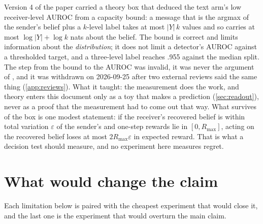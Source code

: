 \documentclass[11pt,a4paper]{report}
\begin{document}
Version 4 of the paper carried a theory box that deduced the text arm's low receiver-level AUROC from a capacity bound: a message that is the argmax of the sender's belief plus a $k$-level label takes at most $|Y|\,k$ values and so carries at most $\log |Y| + \log k$ nats about the belief. The bound is correct and limits information about the \emph{distribution}; it does not limit a detector's AUROC against a thresholded target, and a three-level label reaches .955 against the median split. The step from the bound to the AUROC was invalid, it was never the argument of \citet{2606.20662}, and it was withdrawn on 2026-09-25 after two external reviews said the same thing (\cref{app:reviews}). What it taught: the measurement does the work, and theory enters this document only as a toy that makes a prediction (\cref{sec:readout}), never as a proof that the measurement had to come out that way. What survives of the box is one modest statement: if the receiver's recovered belief is within total variation $\varepsilon$ of the sender's and one-step rewards lie in $[0, R_{\max}]$, acting on the recovered belief loses at most $2 R_{\max} \varepsilon$ in expected reward. That is what a decision test should measure, and no experiment here measures regret.

\section{What would change the claim}
\label{sec:change}

Each limitation below is paired with the cheapest experiment that would close it, and the last one is the experiment that would overturn the main claim.
\end{document}
